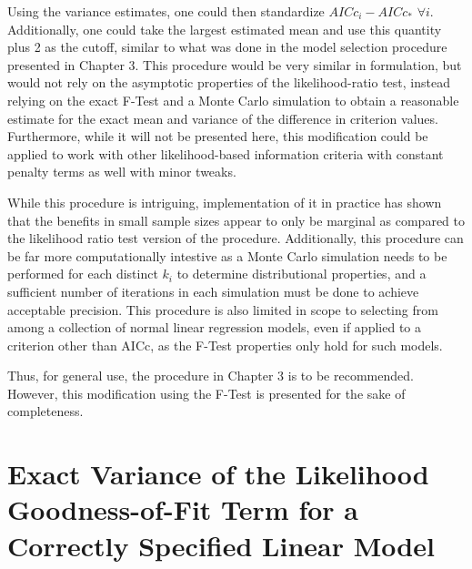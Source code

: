 Using the variance estimates, one could then standardize $AICc_i - AICc_*$ $\forall i$. Additionally, one could take the largest estimated
mean and use this quantity plus 2 as the cutoff, similar to what was done in the model selection procedure presented in Chapter 3. This
procedure would be very similar in formulation, but would not rely on the asymptotic properties of the likelihood-ratio test, instead
relying on the exact F-Test and a Monte Carlo simulation to obtain a reasonable estimate for the exact mean and variance of the difference
in criterion values. Furthermore, while it will not be presented here, this modification could be applied to work with other likelihood-based
information criteria with constant penalty terms as well with minor tweaks.

While this procedure is intriguing, implementation of it in practice has shown that the benefits in small sample sizes appear to only be
marginal as compared to the likelihood ratio test version of the procedure. Additionally, this procedure can be far more computationally
intestive as a Monte Carlo simulation needs to be performed for each distinct $k_i$ to determine distributional properties, and a sufficient
number of iterations in each simulation must be done to achieve acceptable precision. This procedure is also limited in scope to selecting
from among a collection of normal linear regression models, even if applied to a criterion other than AICc, as the F-Test properties only hold
for such models.

Thus, for general use, the procedure in Chapter 3 is to be recommended. However, this modification using the F-Test is presented for the
sake of completeness.


\section*{Exact Variance of the Likelihood Goodness-of-Fit Term for a Correctly Specified Linear Model}

